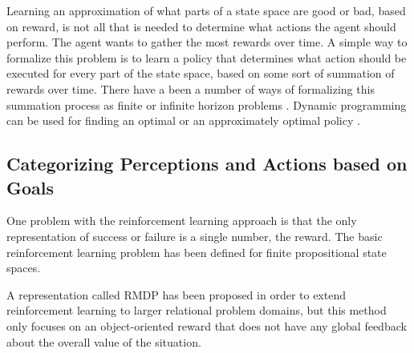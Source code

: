 Learning an approximation of what parts of a state space are good or
bad, based on reward, is not all that is needed to determine what
actions the agent should perform.  The agent wants to gather the most
rewards over time.  A simple way to formalize this problem is to learn
a policy that determines what action should be executed for every part
of the state space, based on some sort of summation of rewards over
time.  There have a been a number of ways of formalizing this
summation process as finite or infinite horizon problems
\citep{sutton:1998}.  Dynamic programming can be used for finding an
optimal or an approximately optimal policy \citep{bertsekas:1995}.

\subsection{Categorizing Perceptions and Actions based on Goals}

One problem with the reinforcement learning approach is that the only
representation of success or failure is a single number, the reward.
The basic reinforcement learning problem has been defined for finite
propositional state spaces.

A representation called \ac{RMDP} has been proposed
\citep{guestrin:2003} in order to extend reinforcement learning to
larger relational problem domains, but this method only focuses on an
object-oriented reward that does not have any global feedback about
the overall value of the situation.


